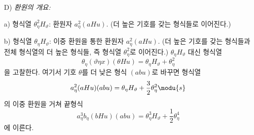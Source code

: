 
\noindent D) \emph{환원의 개요:}

a) 형식열 $\theta_\eta^2H_\vartheta$: 환원자 $a_\eta^2(aHu)$. (더 높은 기호를 갖는 형식들로 이어진다.)

b) 형식열 $\theta_\eta H_\vartheta$: 이중 환원을 통한 환원자 $a_\eta^2(aHu)$.
(더 높은 기호를 갖는 형식들과 전체 형식열의 더 높은 형식들, 즉 형식열 $\theta_\eta^2$로 이어진다.) $\theta_\eta H_\vartheta$ 대신 형식열
\[
\theta_\eta(\vartheta\eta x)(\theta Hu)=\theta_\eta H_\vartheta+\theta_\eta^2
\]
을 고찰한다. 여기서 기호 $\theta$를 더 낮은 형식 $(abu)$로 바꾸면 형식열
\[
a_\eta^2(aHu)(abu)=\theta_\eta H_\vartheta+\frac32\theta_\eta^2\modu{s}
\]
의 이중 환원을 거쳐 끝형식
\[
a_\eta^3b_\eta(bHu)(abu)=\theta_\eta^3H_\vartheta+\frac12\theta_\eta^4
\]
에 이른다.
